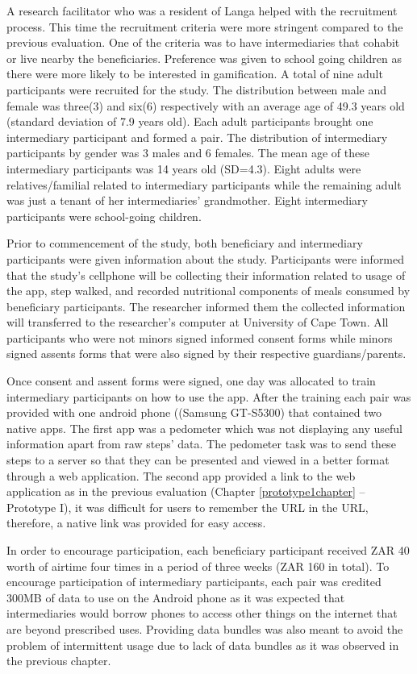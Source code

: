 A research facilitator who was a resident of Langa helped with the recruitment process. This time the recruitment criteria were more stringent compared to the previous evaluation. One of the criteria was to have intermediaries that cohabit or live nearby the beneficiaries. Preference was given to school going children as there were more likely to be interested in gamification. A total of nine adult participants were recruited for the study. The distribution between male and female was three(3) and six(6) respectively with an average age of 49.3 years old (standard deviation of 7.9 years old). Each adult participants brought one intermediary participant and formed a pair. The distribution of intermediary participants by gender was 3 males and 6 females. The mean age of these intermediary participants was 14 years old (SD=4.3). Eight adults  were relatives/familial related to intermediary participants while the remaining adult was just a tenant of her intermediaries' grandmother. Eight intermediary participants were school-going children.

Prior to commencement of the study, both beneficiary and intermediary participants were given information about the study. Participants were informed that the study's cellphone will be collecting their information related to usage of the app, step walked,  and recorded nutritional components of meals consumed by beneficiary participants. The researcher informed them the collected information will transferred to the researcher's computer at University of Cape Town. All participants who were not minors signed informed consent forms while minors signed assents forms that were also signed by their respective guardians/parents.

Once consent and assent forms were signed, one day was allocated to train intermediary participants on how to use the app. After the training each pair was provided with one android phone ((Samsung
GT-S5300) that contained two native apps. The first app was a pedometer which was not displaying any useful information apart from raw steps' data. The pedometer task was to send these steps to a server so that they can be presented  and viewed in a better format through a web application. The second app provided a link to the web application as in the previous evaluation (Chapter \ref{prototype1chapter} -- Prototype I), it was difficult for users to remember the URL in the URL, therefore, a native link was provided for easy access.

In order to encourage participation, each beneficiary participant received ZAR 40 worth of airtime four times in a period of three weeks (ZAR 160 in total). To encourage participation of intermediary participants, each pair was credited 300MB of data to use on the Android phone as it was expected that intermediaries would borrow phones to access other things on the internet that are beyond prescribed uses. Providing data bundles was also meant to avoid the problem of intermittent usage due to lack of data bundles as it was observed in the previous chapter.


